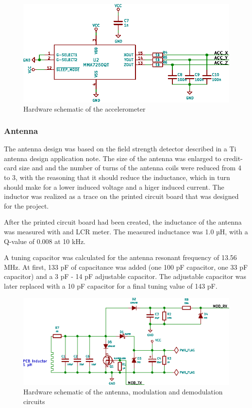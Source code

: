 \begin{figure}[h!]
    \centering
    \includegraphics[scale=1.0]{res/schematic-acc.eps}
    \caption{Hardware schematic of the accelerometer}
    \label{fig:sch-acc}
\end{figure}

\subsubsection{Antenna}
The antenna design was based on the field strength detector described in a Ti antenna design application note\cite{ti-antenna}.
The size of the antenna was enlarged to credit-card size and and the number of turns of the antenna coils were reduced from 4 to 3, with the reasoning that it should reduce the inductance, which in turn should make for a lower induced voltage and a higer induced current.
The inductor was realized as a trace on the printed circuit board that was designed for the project.

After the printed circuit board had been created, the inductance of the antenna was measured with and LCR meter.
The measured inductance was 1.0 µH, with a Q-value of 0.008 at 10 kHz.

A tuning capacitor was calculated for the antenna resonant frequency of 13.56 MHz.
At first, 133 pF of capacitance was added (one 100 pF capacitor, one 33 pF capacitor) and a 3 pF - 14 pF adjustable capacitor. The
adjustable capacitor was later replaced with a 10 pF capacitor for a final tuning value of 143 pF.

\begin{figure}[h!]
    \centering
    \includegraphics[scale=1.0]{res/schematic-antenna.eps}
    \caption{Hardware schematic of the antenna, modulation and demodulation circuits}
    \label{fig:sch-antenna}
\end{figure}

